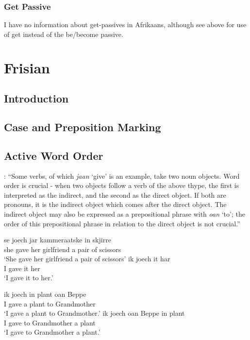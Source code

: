 \subsubsection{Get Passive}
I have no information about get-passives in Afrikaans, although see above for use of get instead of the be/become passive.

\section{Frisian}\label{sec:Frisian}
\subsection{Introduction}
\subsection{Case and Preposition Marking}
\subsection{Active Word Order}
\cite[105]{Tiersma.1985}: ``Some verbs, of which \emph{jaan} `give' is an example, take two noun objects. Word order is crucial - when two objects follow a verb of the above thype, the first is interpreted as the indirect, and the second as the direct object. If both are pronouns, it is the indirect object which comes after the direct object. The indirect object may also be expressed as a prepositional phrase with \emph{oan} `to'; the order of this prepositional phrase in relation to the direct object is not crucial.''
\begin{exe}
\ex \gll se joech jar kammeraatske in skjirre\\
she gave her girlfriend a {pair of scissors}\\
\trans `She gave her girlfriend a pair of scissors'
\ex \gll ik joech it har\\
I gave it her\\
\trans `I gave it to her.'
\ex
\begin{xlist}
\ex ik joech in plant oan Beppe\\
I gave a plant to Grandmother\\
\trans `I gave a plant to Grandmother.'
\ex ik joech oan Beppe in plant\\
I gave to Grandmother a plant \\
\trans `I gave to Grandmother a plant.'
\end{xlist}
\end{exe}
